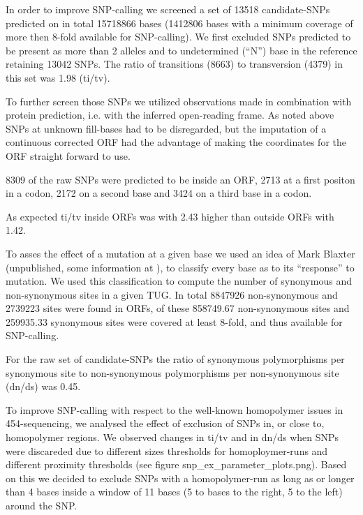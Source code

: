 \documentclass[10pt]{bmc_article}
\newenvironment{bmcformat}{\begin{raggedright}\baselineskip20pt\sloppy\setboolean{publ}{false}}{\end{raggedright}\baselineskip20pt\sloppy}
\begin{document}
\begin{bmcformat}






In order to improve SNP-calling we screened a set of 13518
candidate-SNPs predicted on in total 15718866 bases
(1412806 bases with a minimum coverage of more then 8-fold
available for SNP-calling). We first excluded SNPs predicted to be
present as more than 2 alleles and to undetermined (``N'') base in the
reference retaining 13042 SNPs. The ratio of transitions
(8663) to transversion (4379) in
this set was 1.98 (ti/tv).

To further screen those SNPs we utilized observations made in
combination with protein prediction, i.e. with the inferred
open-reading frame. As noted above SNPs at unknown fill-bases had to
be disregarded, but the imputation of a continuous corrected ORF had
the advantage of making the coordinates for the ORF straight forward
to use.

8309 of the raw SNPs were predicted to be inside
an ORF, 2713 at a first positon in a codon,
2172 on a second base and
3424 on a third base in a codon.

As expected ti/tv inside ORFs was with
2.43 higher than outside ORFs
with 1.42.

To asses the effect of a mutation at a given base we used an idea of
Mark Blaxter (unpublished, some information at \cite{Marks_ontology}),
to classify every base as to its ``response'' to mutation. We used
this classification to compute the number of synonymous and
non-synonymous sites in a given TUG. In total 8847926
non-synonymous and 2739223 sites were found in ORFs, of
these 858749.67 non-synonymous sites and
259935.33 synonymous sites were covered at least 8-fold,
and thus available for SNP-calling.

For the raw set of candidate-SNPs the ratio of synonymous
polymorphisms per synonymous site to non-synonymous polymorphisms per
non-synonymous site (dn/ds) was 0.45.

To improve SNP-calling with respect to the well-known homopolymer
issues in 454-sequencing\cite{pmid21685085}, we analysed the effect of
exclusion of SNPs in, or close to, homopolymer regions. We observed
changes in ti/tv and in dn/ds when SNPs were discareded due to
different sizes thresholds for homoploymer-runs and different
proximity thresholds (see figure snp\_ex\_parameter\_plots.png). Based
on this we decided to exclude SNPs with a homopolymer-run as long as
or longer than 4 bases inside a window of 11 bases (5 to bases to the
right, 5 to the left) around the SNP.


\end{bmcformat}
\end{document}
